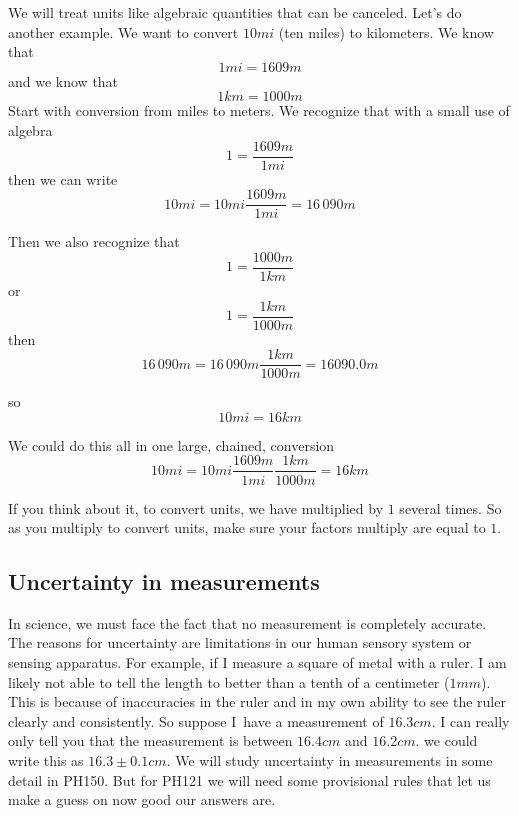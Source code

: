 \documentclass[]{Book}
\begin{document}
We will treat units like algebraic quantities that can be canceled. Let's do
another example. We want to convert $10\unit{mi}$ (ten miles) to kilometers.
We know that 
\begin{equation}
	1\unit{mi}=1609\unit{m}
\end{equation}%
and we know that 
\begin{equation}
	1\unit{km}=1000\unit{m}
\end{equation}%
Start with conversion from miles to meters. We recognize that with a small
use of algebra 
\begin{equation}
	1=\frac{1609\unit{m}}{1\unit{mi}}
\end{equation}%
then we can write 
\begin{equation}
	10\unit{mi}=10\unit{mi}\frac{1609\unit{m}}{1\unit{mi}}=\allowbreak 16\,090%
	\unit{m}
\end{equation}

Then we also recognize that 
\begin{equation}
	1=\frac{1000\unit{m}}{1\unit{km}}
\end{equation}%
or%
\begin{equation}
	1=\frac{1\unit{km}}{1000\unit{m}}
\end{equation}%
then%
\begin{equation}
	\allowbreak 16\,090\unit{m}=16\,090\unit{m}\frac{1\unit{km}}{1000\unit{m}}%
	=\allowbreak 16090.0\unit{m}
\end{equation}

so 
\begin{equation}
	10\unit{mi}=16\unit{km}
\end{equation}

We could do this all in one large, chained, conversion%
\begin{equation}
	10\unit{mi}=10\unit{mi}\frac{1609\unit{m}}{1\unit{mi}}\frac{1\unit{km}}{1000%
		\unit{m}}=16\unit{km}
\end{equation}

If you think about it, to convert units, we have multiplied by $1$ several
times. So as you multiply to convert units, make sure your factors multiply
are equal to $1.$

\subsection{Uncertainty in measurements}

In science, we must face the fact that no measurement is completely
accurate. The reasons for uncertainty are limitations in our human sensory
system or sensing apparatus. For example, if I measure a square of metal
with a ruler. I am likely not able to tell the length to better than a tenth
of a centimeter ($1\unit{mm}$). This is because of inaccuracies in the ruler
and in my own ability to see the ruler clearly and consistently. So suppose
I\ have a measurement of $16.3\unit{cm}$. I can really only tell you that
the measurement is between $16.4\unit{cm}$ and $16.2\unit{cm}.$ we could
write this as $16.3\pm 0.1\unit{cm}.$ We will study uncertainty in
measurements in some detail in PH150. But for PH121 we will need some
provisional rules that let us make a guess on now good our answers are.
\end{document}
